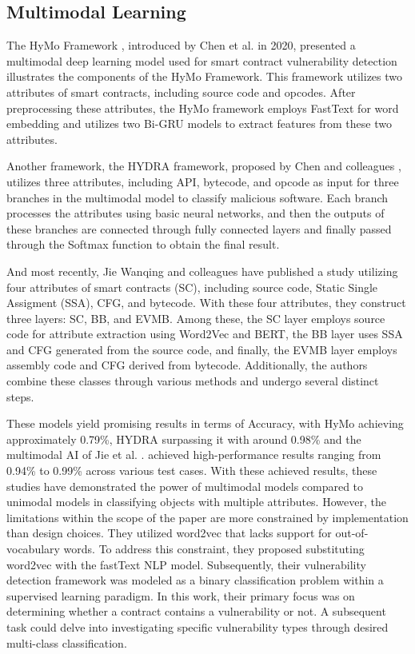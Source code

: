 \subsection{Multimodal Learning}
 The HyMo Framework \cite{hymo}, introduced by Chen et al. in 2020, presented a multimodal deep learning model used for smart contract vulnerability detection illustrates the components of the HyMo Framework. This framework utilizes two attributes of smart contracts, including source code and opcodes. After preprocessing these attributes, the HyMo framework employs FastText for word embedding and utilizes two Bi-GRU models to extract features from these two attributes.
 
Another framework, the HYDRA framework, proposed by Chen and colleagues \cite{hydra}, utilizes three attributes, including API, bytecode, and opcode as input for three branches in the multimodal model to classify malicious software. Each branch processes the attributes using basic neural networks, and then the outputs of these branches are connected through fully connected layers and finally passed through the Softmax function to obtain the final result.

And most recently, Jie Wanqing and colleagues have published a study \cite{2023novel} utilizing four attributes of smart contracts (SC), including source code, Static Single Assigment (SSA), CFG, and bytecode. With these four attributes, they construct three layers: SC, BB, and EVMB. Among these, the SC layer employs source code for attribute extraction using Word2Vec and BERT, the BB layer uses SSA and CFG generated from the source code, and finally, the EVMB layer employs assembly code and CFG derived from bytecode. Additionally, the authors combine these classes through various methods and undergo several distinct steps.

These models yield promising results in terms of Accuracy, with HyMo \cite{hymo} achieving approximately 0.79\%, HYDRA \cite{hydra} surpassing it with around 0.98\% and the multimodal AI of Jie et al. \cite{2023novel}. achieved high-performance results ranging from 0.94\% to 0.99\% across various test cases. With these achieved results, these studies have demonstrated the power of multimodal models compared to unimodal models in classifying objects with multiple attributes. However, the limitations within the scope of the paper are more constrained by implementation than design choices. They utilized word2vec that lacks support for out-of-vocabulary words. To address this constraint, they proposed substituting word2vec with the fastText NLP model. Subsequently, their vulnerability detection framework was modeled as a binary classification problem within a supervised learning paradigm. In this work, their primary focus was on determining whether a contract contains a vulnerability or not. A subsequent task could delve into investigating specific vulnerability types through desired multi-class classification.

